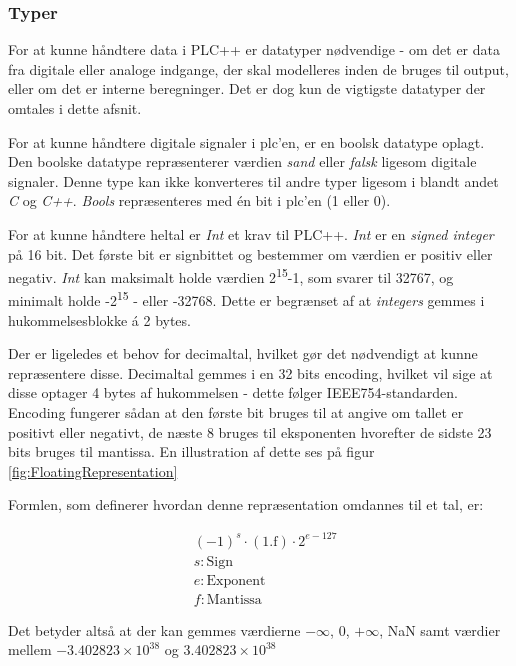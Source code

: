 \subsubsection{Typer}
For at kunne håndtere data i PLC++ er datatyper nødvendige - om det er data fra digitale eller analoge indgange, der skal modelleres inden de bruges til output, eller om det er interne beregninger. Det er dog kun de vigtigste datatyper der omtales i dette afsnit.

For at kunne håndtere digitale signaler i \gls{plc}'en, er en boolsk datatype oplagt. Den boolske datatype repræsenterer værdien \textit{sand} eller \textit{falsk} ligesom digitale signaler. Denne type kan ikke konverteres til andre typer ligesom i blandt andet \textit{C} og \textit{C++}. \textit{Bools} repræsenteres med én bit i \gls{plc}'en (1 eller 0). 

For at kunne håndtere heltal er \textit{Int} et krav til PLC++. \textit{Int} er en \textit{signed integer} på 16 bit. Det første bit er signbittet og bestemmer om værdien er positiv eller negativ. \textit{Int} kan maksimalt holde værdien 2\textsuperscript{15}-1, som svarer til 32767, og minimalt holde -2\textsuperscript{15} - eller -32768. Dette er begrænset af at \textit{integers} gemmes i hukommelsesblokke á 2 bytes.

Der er ligeledes et behov for decimaltal, hvilket gør det nødvendigt at kunne repræsentere disse. Decimaltal gemmes i en 32 bits encoding, hvilket vil sige at disse optager 4 bytes af hukommelsen - dette følger IEEE754-standarden. Encoding fungerer sådan at den første bit bruges til at angive om tallet er positivt eller negativt, de næste 8 bruges til eksponenten hvorefter de sidste 23 bits bruges til mantissa. En illustration af dette ses på figur \ref{fig:FloatingRepresentation}


Formlen, som definerer hvordan denne repræsentation omdannes til et tal, er:

\begin{align*}
&(-1)^s \cdot (1.\text{f}) \cdot 2^{e-127} \\
&s: \text{Sign}\\
&e: \text{Exponent}\\
&f: \text{Mantissa}
\end{align*}

\noindent Det betyder altså at der kan gemmes værdierne $-\infty$, 0, $+\infty$, NaN samt værdier mellem $-3.402823 \times 10^{38}$ og $3.402823 \times 10^{38}$\\

